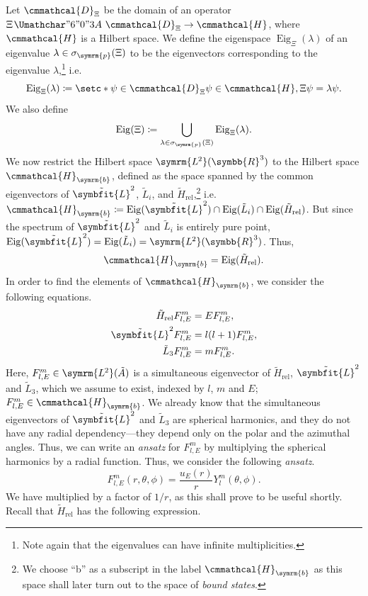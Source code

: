 \documentclass[12pt, a4 paper]{article}
\renewcommand{\symcal}{\cmmathcal}
\theoremstyle{definition}
\newcommand{\ltwo}{\symrm{L\kern-0.3pt^2}}
\newcommand{\ltworthree}{\ltwo(\rr^3)}
\newcommand{\rr}{\symbb{R}}
\newcommand{\cc}{\symbb{C}}
\newcommand{\nn}{\symbb{N}_0}
\newcommand{\hilbert}{\symcal{H}}
\newcommand{\domain}{\symcal{D}}
\newcommand{\spec}{\sigma}
\newcommand{\lvecsquare}{\tilde{\symbfit{L}}^2}
\DeclareMathOperator{\spann}{span}
\newcommand{\hrel}{\tilde{H}_\text{rel}}
\newcommand{\lthree}{\tilde{L}_3}
\newcommand{\flme}{F^m_{l,E}}
\newcommand{\bhilbert}{\hilbert_{\symrm{b}}}
\newcommand{\eigen}{\operatorname{Eig}}
\newcommand{\ltwoa}{\ltwo(\tilde{A})}
\newcommand{\sphe}{Y_l^m}
\renewcommand{\colon}{\nobreak\mskip2mu\mathpunct{}\nonscript
  \mkern-\thinmuskip{\Umathchar"6 "0 "3A}\mskip6muplus1mu\relax}
\begin{document}
    Let \(\domain_{\Xi}\) be the domain of an operator \(\Xi \colon \domain_{\Xi} \rightarrow \hilbert\), where \(\hilbert\) is a Hilbert space. We define the eigenspace \(\eigen_{\Xi}(\lambda)\) of an eigenvalue \(\lambda \in \spec_{\symrm{p}}(\Xi)\) to be the eigenvectors corresponding to the eigenvalue \(\lambda\),\footnote{Note again that the eigenvalues can have infinite multiplicities.} i.e.
    \[
        \eigen_{\Xi}(\lambda) \coloneq \setc*{\psi \in \domain_{\Xi}}{\psi \in \hilbert, \Xi\psi = \lambda\psi}.
    \]
    We also define
    \[
        \eigen(\Xi) \coloneq \bigcup_{\lambda \in \spec_{\symrm{p}}(\Xi)} \eigen_{\Xi}(\lambda).
    \]
    We now restrict the Hilbert space \(\ltworthree\) to the Hilbert space \(\bhilbert\), defined as the space spanned by the common eigenvectors of \(\lvecsquare\), \(\tilde{L}_i\), and \(\hrel\),\footnote{We choose ``b'' as a subscript in the label \(\bhilbert\) as this space shall later turn out to the space of \textit{bound states}.} i.e.\ \(\bhilbert \coloneq \eigen(\lvecsquare) \cap \eigen(\tilde{L}_i) \cap \eigen(\hrel)\). But since the spectrum of \(\lvecsquare\) and \(\tilde{L}_i\) is entirely pure point, \(\eigen(\lvecsquare) = \eigen(\tilde{L}_i) = \ltworthree\). Thus, \[\bhilbert = \eigen(\hrel).\] In order to find the elements of \(\bhilbert\), we consider the following equations.
    \begin{align*}
        \hrel \flme &= E \flme,\\
        \lvecsquare \flme &= l(l+1) \flme,\\
        \lthree \flme &= m \flme.
    \end{align*}
    Here, \(\flme \in \ltwoa\) is a simultaneous eigenvector of \(\hrel\), \(\lvecsquare\) and \(\lthree\), which we assume to exist, indexed by \(l\), \(m\) and \(E\); \(\flme \in \bhilbert\). We already know that the simultaneous eigenvectors of \(\lvecsquare\) and \(\lthree\) are spherical harmonics, and they do not have any radial dependency---they depend only on the polar and the azimuthal angles. Thus, we can write an \textit{ansatz} for \(\flme\) by multiplying the spherical harmonics by a radial function. Thus, we consider the following \textit{ansatz}.
    \[
        \flme(r, \theta, \phi) = \frac{u_E(r)}{r}\sphe(\theta, \phi).
    \]
    We have multiplied by a factor of \(1/r\), as this shall prove to be useful shortly. Recall that \(\hrel\) has the following expression.
\end{document}
